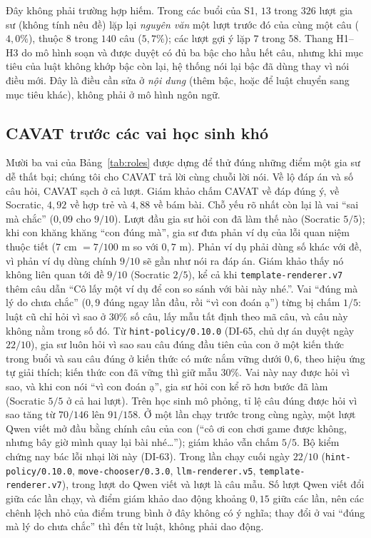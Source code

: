 Đây không phải trường hợp hiếm. Trong các buổi của S1, $13$ trong $326$ lượt gia sư (không tính nêu đề) lặp lại \emph{nguyên văn} một lượt trước đó của cùng một câu ($4{,}0\%$), thuộc $8$ trong $140$ câu ($5{,}7\%$); các lượt gợi ý lặp $7$ trong $58$. Thang H1--H3 do mô hình soạn và được duyệt có đủ ba bậc cho hầu hết câu, nhưng khi mục tiêu của luật không khớp bậc còn lại, hệ thống nói lại bậc đã dùng thay vì nói điều mới. Đây là điều cần sửa ở \emph{nội dung} (thêm bậc, hoặc để luật chuyển sang mục tiêu khác), không phải ở mô hình ngôn ngữ.

\subsection{CAVAT trước các vai học sinh khó}
Mười ba vai của Bảng~\ref{tab:roles} được dựng để thử đúng những điểm một gia sư dễ thất bại; chúng tôi cho CAVAT trả lời cùng chuỗi lời nói. Về lộ đáp án và số câu hỏi, CAVAT sạch ở cả \CavTurns{} lượt. Giám khảo chấm CAVAT \CavIntent{} về đáp đúng ý, \CavSocratic{} về Socratic, $4{,}92$ về hợp trẻ và $4{,}88$ về bám bài. Chỗ yếu rõ nhất còn lại là vai ``sai mà chắc'' ($0{,}09$ cho $9/10$). Lượt đầu gia sư hỏi con đã làm thế nào (Socratic $5/5$); khi con khăng khăng ``con đúng mà'', gia sư đưa phản ví dụ của lỗi quan niệm thuộc tiết ($7$ cm $=7/100$ m so với $0{,}7$ m). Phản ví dụ phải dùng số khác với đề, vì phản ví dụ dùng chính $9/10$ sẽ gần như nói ra đáp án. Giám khảo thấy nó không liên quan tới đề $9/10$ (Socratic $2/5$), kể cả khi \texttt{template-renderer.v7} thêm câu dẫn ``Cô lấy một ví dụ để con so sánh với bài này nhé.''. Vai ``đúng mà lý do chưa chắc'' ($0{,}9$ đúng ngay lần đầu, rồi ``vì con đoán ạ'') từng bị chấm $1/5$: luật cũ chỉ hỏi vì sao ở $30\%$ số câu, lấy mẫu tất định theo mã câu, và câu này không nằm trong số đó. Từ \texttt{hint-policy/0.10.0} (DI-65, chủ dự án duyệt ngày $22/10$), gia sư luôn hỏi vì sao sau câu đúng đầu tiên của con ở một kiến thức trong buổi và sau câu đúng ở kiến thức có mức nắm vững dưới $0{,}6$, theo hiệu ứng tự giải thích; kiến thức con đã vững thì giữ mẫu $30\%$. Vai này nay được hỏi vì sao, và khi con nói ``vì con đoán ạ'', gia sư hỏi con kể rõ hơn bước đã làm (Socratic $5/5$ ở cả hai lượt). Trên học sinh mô phỏng, tỉ lệ câu đúng được hỏi vì sao tăng từ $70/146$ lên $91/158$. Ở một lần chạy trước trong cùng ngày, một lượt Qwen viết mở đầu bằng chính câu của con (``cô ơi con chơi game được không, nhưng bây giờ mình quay lại bài nhé\ldots''); giám khảo vẫn chấm $5/5$. Bộ kiểm chứng nay bác lỗi nhại lời này (DI-63). Trong lần chạy cuối ngày $22/10$ (\texttt{hint-policy/0.10.0}, \texttt{move-chooser/0.3.0}, \texttt{llm-renderer.v5}, \texttt{template-renderer.v7}), \CavTurnsLLM{} trong \CavTurns{} lượt do Qwen viết và \CavTurnsTemplate{} lượt là câu mẫu. Số lượt Qwen viết đổi giữa các lần chạy, và điểm giám khảo dao động khoảng $0{,}15$ giữa các lần, nên các chênh lệch nhỏ của điểm trung bình ở đây không có ý nghĩa; thay đổi ở vai ``đúng mà lý do chưa chắc'' thì đến từ luật, không phải dao động.
